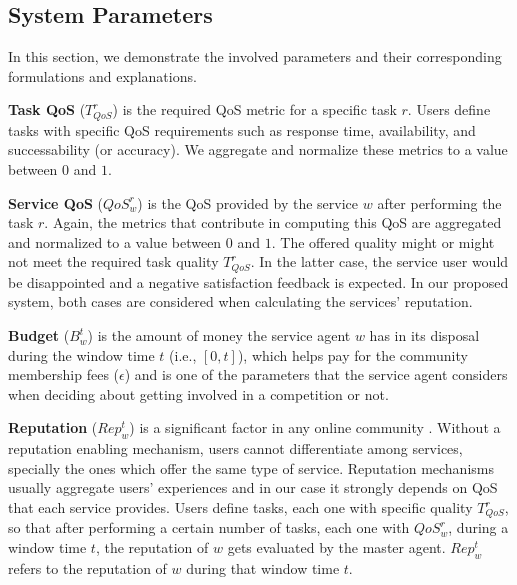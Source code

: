 

\subsection{System Parameters}
In this section, we demonstrate the involved parameters and their
corresponding formulations and explanations.

\textbf{Task QoS} ($T_{QoS}^r$) is the required QoS metric for a
specific task $r$. Users define tasks with specific QoS
requirements such as response time, availability, and
successability (or accuracy). We aggregate and
normalize these metrics to a value between $0$
and $1$. %

\textbf{Service QoS} ($QoS_w^r$) is the QoS provided by the
service $w$ after performing the task $r$. Again, the metrics that
contribute in computing this QoS are aggregated and normalized to
a value between $0$ and $1$. The offered quality might or might
not meet the required task quality $T_{QoS}^r$. In the latter
case, the service user would be disappointed and a negative
satisfaction feedback is expected. In our proposed system, both
cases are considered when calculating the services' reputation.


\textbf{Budget} ($B_w^t$) is the amount of money the service agent
$w$ has in its disposal during the window time $t$ (i.e.,
$[0,t]$), which helps pay for the community membership fees
($\epsilon$) and is one of the parameters that the service agent
considers when deciding about getting involved in a competition or
not.

\textbf{Reputation} ($Rep_w^t$) is a significant factor in any
online community \cite{Fouss:2010:PRM:1751668.1751727}. Without a reputation enabling
mechanism, users cannot differentiate among services, specially
the ones which offer the same type of service. Reputation
mechanisms usually aggregate users' experiences and in our case it
strongly depends on QoS that each service provides. Users define
tasks, each one with specific quality $T_{QoS}^r$, so that after
performing a certain number of tasks, each one with $QoS_w^r$,
during a window time $t$, the reputation of $w$ gets evaluated by
the master agent. $Rep_{w}^{t}$ refers to the reputation of $w$
during that window time $t$.

